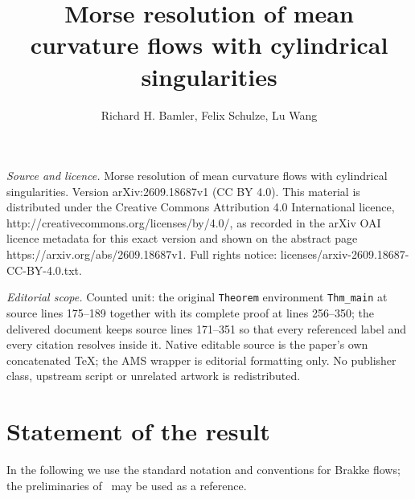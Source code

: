 \documentclass[10pt,a4paper]{amsart}
\numberwithin{equation}{section}
\begin{document}
\title[Morse resolution of mean curvature flows with cylindrical si]{Morse resolution of mean curvature flows with cylindrical singularities}
\author{Richard H. Bamler, Felix Schulze, Lu Wang}
\date{}
\maketitle
\noindent\emph{Source and licence.} Morse resolution of mean curvature flows with cylindrical singularities. Version arXiv:2609.18687v1 (CC BY 4.0). This material is distributed under the Creative Commons Attribution 4.0 International licence, http://creativecommons.org/licenses/by/4.0/, as recorded in the arXiv OAI licence metadata for this exact version and shown on the abstract page https://arxiv.org/abs/2609.18687v1. Full rights notice: licenses/arxiv-2609.18687-CC-BY-4.0.txt.\par\smallskip
\noindent\textit{Editorial scope.} Counted unit: the original \texttt{Theorem} environment \texttt{Thm\_main} at source lines 175--189 together with its complete proof at lines 256--350; the delivered document keeps source lines 171--351 so that every referenced label and every citation resolves inside it. Native editable source is the paper's own concatenated TeX; the AMS wrapper is editorial formatting only. No publisher class, upstream script or unrelated artwork is redistributed.
\section{Statement of the result}

In the following we use the standard notation and conventions for Brakke flows; the preliminaries of~\cite{BamlerLai} may be used as a reference.
\end{document}
